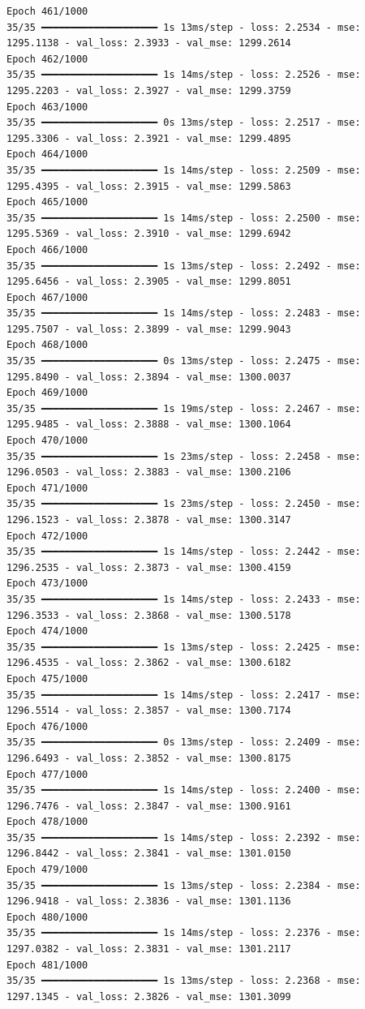 \documentclass[
  letterpaper,
  DIV=11,
  numbers=noendperiod]{scrreprt}
\begin{document}
\begin{verbatim}
Epoch 461/1000
35/35 ━━━━━━━━━━━━━━━━━━━━ 1s 13ms/step - loss: 2.2534 - mse: 1295.1138 - val_loss: 2.3933 - val_mse: 1299.2614
Epoch 462/1000
35/35 ━━━━━━━━━━━━━━━━━━━━ 1s 14ms/step - loss: 2.2526 - mse: 1295.2203 - val_loss: 2.3927 - val_mse: 1299.3759
Epoch 463/1000
35/35 ━━━━━━━━━━━━━━━━━━━━ 0s 13ms/step - loss: 2.2517 - mse: 1295.3306 - val_loss: 2.3921 - val_mse: 1299.4895
Epoch 464/1000
35/35 ━━━━━━━━━━━━━━━━━━━━ 1s 14ms/step - loss: 2.2509 - mse: 1295.4395 - val_loss: 2.3915 - val_mse: 1299.5863
Epoch 465/1000
35/35 ━━━━━━━━━━━━━━━━━━━━ 1s 14ms/step - loss: 2.2500 - mse: 1295.5369 - val_loss: 2.3910 - val_mse: 1299.6942
Epoch 466/1000
35/35 ━━━━━━━━━━━━━━━━━━━━ 1s 13ms/step - loss: 2.2492 - mse: 1295.6456 - val_loss: 2.3905 - val_mse: 1299.8051
Epoch 467/1000
35/35 ━━━━━━━━━━━━━━━━━━━━ 1s 14ms/step - loss: 2.2483 - mse: 1295.7507 - val_loss: 2.3899 - val_mse: 1299.9043
Epoch 468/1000
35/35 ━━━━━━━━━━━━━━━━━━━━ 0s 13ms/step - loss: 2.2475 - mse: 1295.8490 - val_loss: 2.3894 - val_mse: 1300.0037
Epoch 469/1000
35/35 ━━━━━━━━━━━━━━━━━━━━ 1s 19ms/step - loss: 2.2467 - mse: 1295.9485 - val_loss: 2.3888 - val_mse: 1300.1064
Epoch 470/1000
35/35 ━━━━━━━━━━━━━━━━━━━━ 1s 23ms/step - loss: 2.2458 - mse: 1296.0503 - val_loss: 2.3883 - val_mse: 1300.2106
Epoch 471/1000
35/35 ━━━━━━━━━━━━━━━━━━━━ 1s 23ms/step - loss: 2.2450 - mse: 1296.1523 - val_loss: 2.3878 - val_mse: 1300.3147
Epoch 472/1000
35/35 ━━━━━━━━━━━━━━━━━━━━ 1s 14ms/step - loss: 2.2442 - mse: 1296.2535 - val_loss: 2.3873 - val_mse: 1300.4159
Epoch 473/1000
35/35 ━━━━━━━━━━━━━━━━━━━━ 1s 14ms/step - loss: 2.2433 - mse: 1296.3533 - val_loss: 2.3868 - val_mse: 1300.5178
Epoch 474/1000
35/35 ━━━━━━━━━━━━━━━━━━━━ 1s 13ms/step - loss: 2.2425 - mse: 1296.4535 - val_loss: 2.3862 - val_mse: 1300.6182
Epoch 475/1000
35/35 ━━━━━━━━━━━━━━━━━━━━ 1s 14ms/step - loss: 2.2417 - mse: 1296.5514 - val_loss: 2.3857 - val_mse: 1300.7174
Epoch 476/1000
35/35 ━━━━━━━━━━━━━━━━━━━━ 0s 13ms/step - loss: 2.2409 - mse: 1296.6493 - val_loss: 2.3852 - val_mse: 1300.8175
Epoch 477/1000
35/35 ━━━━━━━━━━━━━━━━━━━━ 1s 14ms/step - loss: 2.2400 - mse: 1296.7476 - val_loss: 2.3847 - val_mse: 1300.9161
Epoch 478/1000
35/35 ━━━━━━━━━━━━━━━━━━━━ 1s 14ms/step - loss: 2.2392 - mse: 1296.8442 - val_loss: 2.3841 - val_mse: 1301.0150
Epoch 479/1000
35/35 ━━━━━━━━━━━━━━━━━━━━ 1s 13ms/step - loss: 2.2384 - mse: 1296.9418 - val_loss: 2.3836 - val_mse: 1301.1136
Epoch 480/1000
35/35 ━━━━━━━━━━━━━━━━━━━━ 1s 14ms/step - loss: 2.2376 - mse: 1297.0382 - val_loss: 2.3831 - val_mse: 1301.2117
Epoch 481/1000
35/35 ━━━━━━━━━━━━━━━━━━━━ 1s 13ms/step - loss: 2.2368 - mse: 1297.1345 - val_loss: 2.3826 - val_mse: 1301.3099

\end{verbatim}
\end{document}
